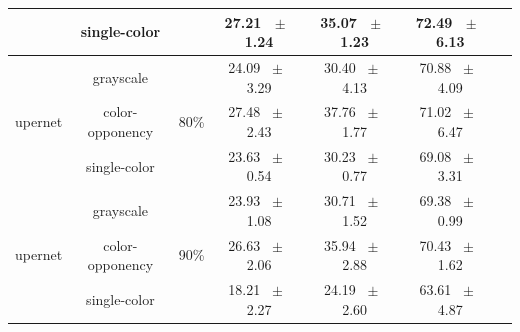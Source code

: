 \begin{table}[h]
\begin{tabular}{@{}lccc ccc@{}}
    & single-color & & 27.21 ~$\pm$~ 1.24 & 35.07 ~$\pm$~ 1.23 & 72.49 ~$\pm$~ 6.13 \\
    \midrule
    \multirow{3}{*}{upernet} & grayscale & \multirow{3}{*}{80\%} & 24.09 ~$\pm$~ 3.29 & 30.40 ~$\pm$~ 4.13 & 70.88 ~$\pm$~ 4.09 \\
    & color-opponency & & 27.48 ~$\pm$~ 2.43 & 37.76 ~$\pm$~ 1.77 & 71.02 ~$\pm$~ 6.47 \\
    & single-color & & 23.63 ~$\pm$~ 0.54 & 30.23 ~$\pm$~ 0.77 & 69.08 ~$\pm$~ 3.31 \\
    \midrule
    \multirow{3}{*}{upernet} & grayscale & \multirow{3}{*}{90\%} & 23.93 ~$\pm$~ 1.08 & 30.71 ~$\pm$~ 1.52 & 69.38 ~$\pm$~ 0.99 \\
    & color-opponency & & 26.63 ~$\pm$~ 2.06 & 35.94 ~$\pm$~ 2.88 & 70.43 ~$\pm$~ 1.62 \\
    & single-color & & 18.21 ~$\pm$~ 2.27 & 24.19 ~$\pm$~ 2.60 & 63.61 ~$\pm$~ 4.87 \\
    \midrule
    \bottomrule
  \end{tabular}
  \label{tab:sparse_upernet_acdc_snow}
\end{table}